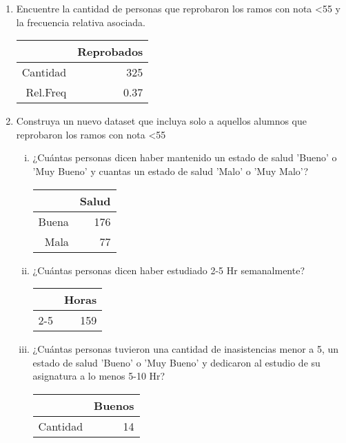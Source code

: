 \documentclass[12pt,letterpaper,hidelinks]{article}
\begin{document}
\begin{enumerate}[\hspace{.5cm} a)]
\item Encuentre la cantidad de personas que reprobaron los ramos con nota <55 y la frecuencia relativa asociada.

\begin{table}[!ht]
\centering
\begin{tabular}{|rr|}
  \hline
 & Reprobados \\ 
  \hline
Cantidad & 325 \\ 
  Rel.Freq & 0.37 \\ 
   \hline
\end{tabular}
\end{table}

\clearpage

\item Construya un nuevo dataset que incluya solo a aquellos alumnos que reprobaron los ramos con nota <55

\begin{enumerate}[i)]
\item ¿Cuántas personas dicen haber mantenido un estado de salud ’Bueno’ o ’Muy Bueno’ y cuantas un estado de salud ’Malo’ o ’Muy Malo’?

\begin{table}[!ht]
\centering
\begin{tabular}{|rr|}
  \hline
 & Salud \\ 
  \hline
Buena & 176 \\ 
  Mala &  77 \\ 
   \hline
\end{tabular}
\end{table}

\item ¿Cuántas personas dicen haber estudiado 2-5 Hr semanalmente?

\begin{table}[!ht]
\centering
\begin{tabular}{|rr|}
  \hline
 & Horas \\ 
  \hline
2-5 & 159 \\ 
   \hline
\end{tabular}
\end{table}

\item ¿Cuántas personas tuvieron una cantidad de inasistencias menor a 5, un estado de salud ’Bueno’ o ’Muy Bueno’ y dedicaron al estudio de su asignatura a lo menos 5-10 Hr?

\begin{table}[!ht]
\centering
\begin{tabular}{|rr|}
  \hline
 & Buenos \\ 
  \hline
Cantidad &  14 \\ 
   \hline
\end{tabular}
\end{table}


\end{enumerate}
\end{enumerate}
\end{document}
